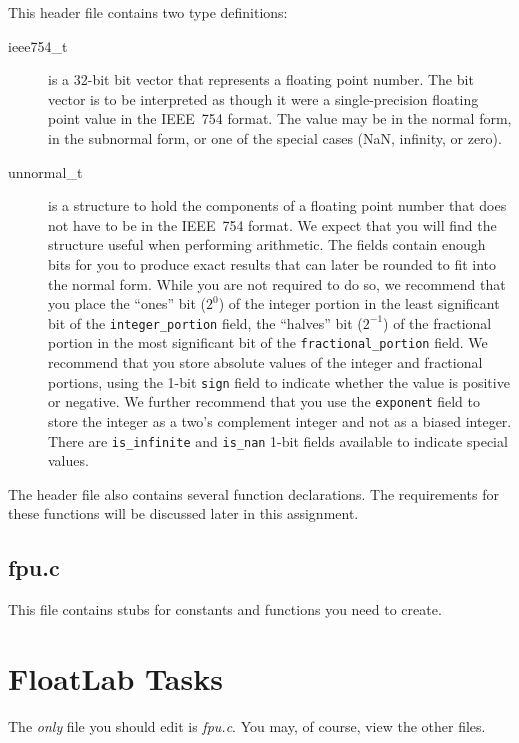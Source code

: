     This header file contains two type definitions:
    \begin{description}
        \item[ieee754\_t] is a 32-bit bit vector that represents a floating point number.
            The bit vector is to be interpreted as though it were a single-precision floating point value in the IEEE~754 format.
            The value may be in the normal form, in the subnormal form, or one of the special cases (NaN, infinity, or zero).
        \item[unnormal\_t] is a structure to hold the components of a floating point number that does not have to be in the IEEE~754 format.
            We expect that you will find the structure useful when performing arithmetic.
            The fields contain enough bits for you to produce exact results that can later be rounded to fit into the normal form.
            While you are not required to do so, we recommend that you place the ``ones'' bit ($2^0$) of the integer portion in the least significant bit of the \lstinline{integer_portion} field, the ``halves'' bit ($2^{-1}$) of the fractional portion in the most significant bit of the \lstinline{fractional_portion} field.
            We recommend that you store absolute values of the integer and fractional portions, using the 1-bit \lstinline{sign} field to indicate whether the value is positive or negative.
            We further recommend that you use the \lstinline{exponent} field to store the integer as a two's complement integer and not as a biased integer.
            There are \lstinline{is_infinite} and \lstinline{is_nan} 1-bit fields available to indicate special values.
    \end{description}
    The header file also contains several function declarations.
    The requirements for these functions will be discussed later in this assignment.

    \subsection{fpu.c}

    This file contains stubs for constants and functions you need to create.


    \section{FloatLab Tasks}

    The \textit{only} file you should edit is \textit{fpu.c}.
    You may, of course, view the other files.

